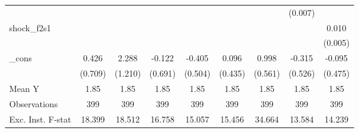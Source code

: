 {\begin{tabular}{l*{8}{c}}
            &                     &                     &                     &                     &                     &                     &     (0.007)         &                     \\
\addlinespace
shock\_f2s1  &                     &                     &                     &                     &                     &                     &                     &       0.010\sym{*}  \\
            &                     &                     &                     &                     &                     &                     &                     &     (0.005)         \\
\addlinespace
\_cons      &       0.426         &       2.288\sym{*}  &      -0.122         &      -0.405         &       0.096         &       0.998\sym{*}  &      -0.315         &      -0.095         \\
            &     (0.709)         &     (1.210)         &     (0.691)         &     (0.504)         &     (0.435)         &     (0.561)         &     (0.526)         &     (0.475)         \\
\midrule
Mean Y      &        1.85         &        1.85         &        1.85         &        1.85         &        1.85         &        1.85         &        1.85         &        1.85         \\
Observations&         399         &         399         &         399         &         399         &         399         &         399         &         399         &         399         \\
Exc. Inst. F-stat&      18.399         &      18.512         &      16.758         &      15.057         &      15.456         &      34.664         &      13.584         &      14.239         \\
\bottomrule
\end{tabular}
}
